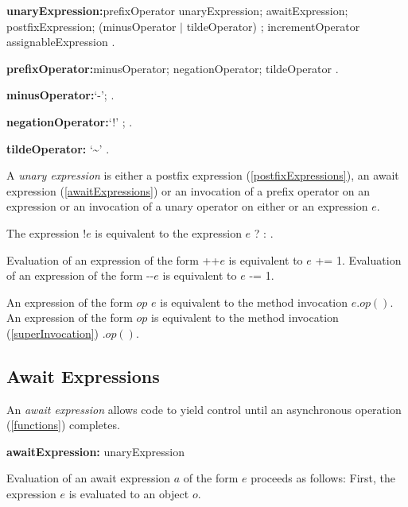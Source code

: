 \documentclass{article}
\newcommand{\code}[1]{{\sf #1}}
\begin{document}
\begin{grammar}
{\bf unaryExpression:}prefixOperator unaryExpression;
      awaitExpression;
      postfixExpression;
      (minusOperator $|$ tildeOperator) \SUPER{};
      incrementOperator assignableExpression
    .

 {\bf prefixOperator:}minusOperator;
      negationOperator;
      tildeOperator
    .


  {\bf minusOperator:}`-';  .


    {\bf negationOperator:}`!' ;
      .

    {\bf tildeOperator:}  `\~{}'
    .


\end{grammar}

\LMHash{}
A {\em unary expression} is either a postfix expression  (\ref{postfixExpressions}), an await expression (\ref{awaitExpressions}) or an invocation of a prefix operator on an expression or an invocation of a unary operator on either \SUPER{} or an expression $e$.

\LMHash{}
The expression $!e$ is equivalent to the expression \code{$e$ ? \FALSE{} : \TRUE{}}.

\LMHash{}
Evaluation of an expression of the form \code{++$e$} is equivalent to \code{$e$ += 1}.  Evaluation of an expression of the form \code{-{}-$e$} is equivalent to \code{$e$ -= 1}.


\LMHash{}
An expression of the form \code{$op$ $e$} is equivalent to the method invocation \code{$e.op()$}. An expression of the form \code{$op$ \SUPER{}} is equivalent to the method invocation  (\ref{superInvocation}) \code{\SUPER{}.$op()$}.

\subsection{ Await Expressions}

\LMHash{}
An {\em await expression} allows code to yield control until an asynchronous operation (\ref{functions}) completes.

 \begin{grammar}
{\bf awaitExpression:}
      \AWAIT{} unaryExpression
 \end{grammar}

\LMHash{}
Evaluation of an await expression $a$ of the form \AWAIT{} $e$ proceeds as follows:
First, the expression $e$ is evaluated to an object $o$.
\end{document}
